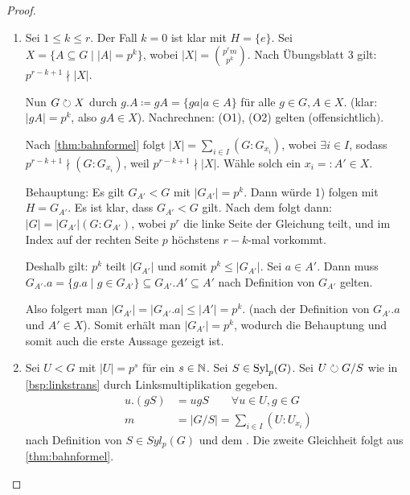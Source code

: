 \documentclass[12pt,a4paper]{scrartcl}
\begin{document}
\begin{proof}
	\leavevmode
	\begin{enumerate}
		\item Sei $1\leq k \leq r$. Der Fall $k = 0$ ist klar mit $H = \{e\}$. Sei $X = \{A\subseteq G \mid |A| = p^k\}$, wobei $|X| = \binom{p^rm}{p^k}$. Nach Übungsblatt 3 gilt: $p^{r-k+1}\nmid |X|$.
		
		Nun $G \circlearrowright X$ durch $g.A \coloneqq gA=\{ga|a\in A\}$ für alle $g\in G, A\in X$. (klar: $|gA| = p^k $, also $gA\in X$). Nachrechnen: (O1), (O2) gelten (offensichtlich). 
		
		Nach \cref{thm:bahnformel} folgt $|X| = \sum_{i\in I}(G:G_{x_i})$, wobei $\exists i\in I$, sodass $p^{r-k+1} \nmid (G:G_{x_i})$, weil $p^{r-k+1}\nmid |X|$. Wähle solch ein $x_i = : A'\in X$.
		
		Behauptung: Es gilt $G_{A'}<G$ mit $|G_{A'}| = p^k$. Dann würde 1) folgen mit $H = G_{A'}$. Es ist klar, dass $G_{A'}<G$ gilt. Nach dem  folgt dann: $|G| = |G_{A'}|(G:G_{A'})$, wobei $p^r$ die linke Seite der Gleichung teilt, und im Index auf der rechten Seite $p$ höchstens $r-k$-mal vorkommt.
		
		Deshalb gilt: $p^k$ teilt $|G_{A'}|$ und somit $p^k\leq |G_{A'}|$. Sei $a\in A'$. Dann muss $G_{A'}.a = \{g.a\mid g\in G_{A'}\}\subseteq G_{A'}.A'\subseteq A'$ nach Definition von $G_{A'}$ gelten.
		
		Also folgert man $|G_{A'}| = |G_{A'}.a|\leq |A'| = p^k$.  (nach der Definition von $G_{A'}.a$ und $A'\in X$).
		Somit erhält man $|G_{A'}| = p^k$, wodurch die Behauptung und somit auch die erste Aussage gezeigt ist.
		
		\item Sei $U<G$ mit $|U| = p^s$ für ein $s\in\mathbb N$. Sei $S\in \operatorname{Syl}_p(G)$. Sei $U \circlearrowright G/S$ wie in \cref{bsp:linkstrans} durch Linksmultiplikation gegeben.
		\begin{align*}
			u.(gS) &= ugS\qquad \forall u\in U, g\in G \\
			m &= |G/S| = \sum_{i\in I}(U:U_{x_i})
		\end{align*}
		nach Definition von $S\in Syl_p(G)$ und dem . Die zweite Gleichheit folgt aus \cref{thm:bahnformel}.
		

\end{enumerate}
\end{proof}
\end{document}
